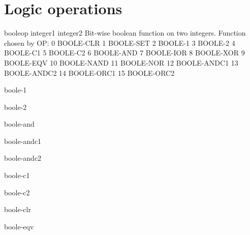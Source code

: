\documentclass[10pt,english]{book}
\begin{document}
\section{Logic operations}
\label{sec:logic-operations}

\begin{function}{boole}{op integer1 integer2}
  Bit-wise boolean function on two integers. Function chosen by OP:
        0       BOOLE-CLR
        1       BOOLE-SET
        2       BOOLE-1
        3       BOOLE-2
        4       BOOLE-C1
        5       BOOLE-C2
        6       BOOLE-AND
        7       BOOLE-IOR
        8       BOOLE-XOR
        9       BOOLE-EQV
        10      BOOLE-NAND
        11      BOOLE-NOR
        12      BOOLE-ANDC1
        13      BOOLE-ANDC2
        14      BOOLE-ORC1
        15      BOOLE-ORC2
\end{function}

\begin{constant}{boole-1}{}
  
\end{constant}

\begin{constant}{boole-2}{}
  
\end{constant}

\begin{constant}{boole-and}{}
  
\end{constant}

\begin{constant}{boole-andc1}{}
  
\end{constant}

\begin{constant}{boole-andc2}{}
  
\end{constant}

\begin{constant}{boole-c1}{}
  
\end{constant}

\begin{constant}{boole-c2}{}
  
\end{constant}

\begin{constant}{boole-clr}{}
  
\end{constant}

\begin{constant}{boole-eqv}{}
  
\end{constant}
\end{document}
